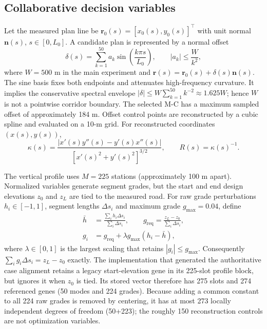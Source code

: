 \documentclass[preprint,12pt]{elsarticle}
\begin{document}
\subsection{Collaborative decision variables}

Let the measured plan line be $\bm r_0(s)=[x_0(s),y_0(s)]^\top$ with unit normal $\bm n(s)$, $s\in[0,L_0]$. A candidate plan is represented by a normal offset
\begin{equation}
\delta(s)=\sum_{k=1}^{50}a_k\sin\left(\frac{k\pi s}{L_0}\right), \qquad
|a_k|\leq \frac{W}{k^2},
\label{eq:sine}
\end{equation}
where $W=500$ m in the main experiment and $\bm r(s)=\bm r_0(s)+\delta(s)\bm n(s)$. The sine basis fixes both endpoints and attenuates high-frequency curvature. It implies the conservative spectral envelope $|\delta|\leq W\sum_{k=1}^{50}k^{-2}\approx1.625W$; hence $W$ is not a pointwise corridor boundary. The selected M-C has a maximum sampled offset of approximately 184 m. Offset control points are reconstructed by a cubic spline and evaluated on a 10-m grid. For reconstructed coordinates $(x(s),y(s))$,
\begin{equation}
\kappa(s)=\frac{|x'(s)y''(s)-y'(s)x''(s)|}
{[x'(s)^2+y'(s)^2]^{3/2}},\qquad R(s)=\kappa(s)^{-1}.
\label{eq:curvature}
\end{equation}

The vertical profile uses $M=225$ stations (approximately 100 m apart). Normalized variables generate segment grades, but the start and end design elevations $z_0$ and $z_L$ are tied to the measured road. For raw grade perturbations $h_i\in[-1,1]$, segment lengths $\Delta s_i$ and maximum grade $g_{\max}=0.04$, define
\begin{align}
\bar h&=\frac{\sum_i h_i\Delta s_i}{\sum_i\Delta s_i},\qquad
g_{\mathrm{req}}=\frac{z_L-z_0}{\sum_i\Delta s_i},\\
g_i&=g_{\mathrm{req}}+\lambda g_{\max}(h_i-\bar h),
\label{eq:grades}
\end{align}
where $\lambda\in[0,1]$ is the largest scaling that retains $|g_i|\leq g_{\max}$. Consequently $\sum_i g_i\Delta s_i=z_L-z_0$ exactly. The implementation that generated the authoritative case alignment retains a legacy start-elevation gene in its 225-slot profile block, but ignores it when $z_0$ is tied. Its stored vector therefore has 275 slots and 274 referenced genes (50 modes and 224 grades). Because adding a common constant to all 224 raw grades is removed by centering, it has at most 273 locally independent degrees of freedom (50+223); the roughly 150 reconstruction controls are not optimization variables.
\end{document}
